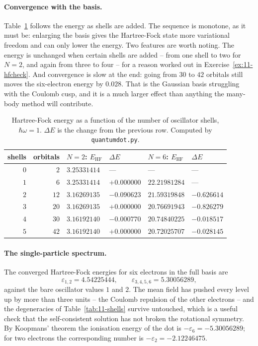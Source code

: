 \paragraph{Convergence with the basis.}
Table~\ref{tab:11-hfconvergence} follows the energy as shells are added.  The
sequence is monotone, as it must be: enlarging the basis gives the
Hartree-Fock state more variational freedom and can only lower the energy.
Two features are worth noting.  The energy is unchanged when certain shells
are added -- from one shell to two for $N=2$, and again from three to four --
for a reason worked out in Exercise~\ref{ex:11-hfcheck}.  And convergence is
slow at the end: going from $30$ to $42$ orbitals still moves the six-electron
energy by $0.028$.  That is the Gaussian basis struggling with the Coulomb
cusp, and it is a much larger effect than anything the many-body method will
contribute.

\begin{table}[h]
\centering
\renewcommand{\arraystretch}{1.25}
\setlength{\tabcolsep}{9pt}
\begin{tabular}{rrllll}
\toprule
shells & orbitals & $N=2$: $E_{\mathrm{HF}}$ & $\Delta E$ &
$N=6$: $E_{\mathrm{HF}}$ & $\Delta E$\\
\midrule
$0$ & $2$  & $3.25331414$ & --- & --- & ---\\
$1$ & $6$  & $3.25331414$ & $+0.000000$ & $22.21981284$ & ---\\
$2$ & $12$ & $3.16269135$ & $-0.090623$ & $21.59319848$ & $-0.626614$\\
$3$ & $20$ & $3.16269135$ & $+0.000000$ & $20.76691943$ & $-0.826279$\\
$4$ & $30$ & $3.16192140$ & $-0.000770$ & $20.74840225$ & $-0.018517$\\
$5$ & $42$ & $3.16192140$ & $+0.000000$ & $20.72025707$ & $-0.028145$\\
\bottomrule
\end{tabular}
\caption{Hartree-Fock energy as a function of the number of oscillator shells,
$\hbar\omega=1$.  $\Delta E$ is the change from the previous row.  Computed by
\texttt{quantumdot.py}.}
\label{tab:11-hfconvergence}
\end{table}

\paragraph{The single-particle spectrum.}
The converged Hartree-Fock energies for six electrons in the full basis are
\begin{equation}
  \varepsilon_{1,2} = 4.54225444,
  \qquad
  \varepsilon_{3,4,5,6} = 5.30056289,
  \label{eq:11-hfspectrum}
\end{equation}
against the bare oscillator values $1$ and $2$.  The mean field has pushed
every level up by more than three units -- the Coulomb repulsion of the other
electrons -- and the degeneracies of Table~\ref{tab:11-shells} survive
untouched, which is a useful check that the self-consistent solution has not
broken the rotational symmetry.  By Koopmans' theorem the ionisation energy of
the dot is $-\varepsilon_6=-5.30056289$; for two electrons the corresponding
number is $-\varepsilon_2=-2.12246475$.

